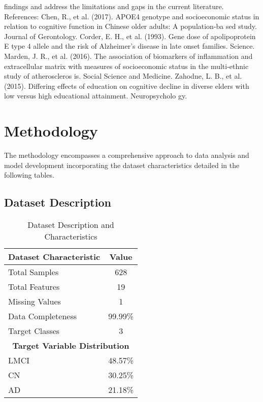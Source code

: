 \documentclass[conference]{IEEEtran}
\begin{document}
findings and address the limitations and gaps in the current literature. References: Chen, R., et al. (2017). APOE4 genotype and socioeconomic status in relation to cognitive function in Chinese older adults: A population-ba sed study. Journal of Gerontology. Corder, E. H., et al. (1993). Gene dose of apolipoprotein E type 4 allele and the risk of Alzheimer's disease in late onset families. Science. Marden, J. R., et al. (2016). The association of biomarkers of inflammation and extracellular matrix with measures of socioeconomic status in the multi-ethnic study of atheroscleros is. Social Science and Medicine. Zahodne, L. B., et al. (2015). Differing effects of education on cognitive decline in diverse elders with low versus high educational attainment. Neuropsycholo gy.

\section{Methodology}
The methodology encompasses a comprehensive approach to data analysis and model development incorporating the dataset characteristics detailed in the following tables.

\subsection{Dataset Description}

\begin{table}[!h]
\centering
\caption{Dataset Description and Characteristics}
\label{tab:dataset_description}
\begin{tabular}{|l|c|}
\hline
\textbf{Dataset Characteristic} & \textbf{Value} \\
\hline
Total Samples & 628 \\
\hline
Total Features & 19 \\
\hline
Missing Values & 1 \\
\hline
Data Completeness & 99.99\% \\
\hline
Target Classes & 3 \\
\hline
\hline
\multicolumn{2}{|c|}{\textbf{Target Variable Distribution}} \\
\hline
LMCI & 48.57\% \\
\hline
CN & 30.25\% \\
\hline
AD & 21.18\% \\
\hline
\end{tabular}
\end{table}
\end{document}
